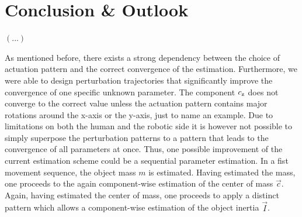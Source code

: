 \chapter{Conclusion \& Outlook}

$\left(...\right)$


As mentioned before, there exists a strong dependency between the choice of actuation pattern and the correct convergence of the estimation. Furthermore, we were able to design perturbation trajectories that significantly improve the convergence of one specific unknown parameter. The component $c_{\mathrm{z}}$ does not converge to the 
correct value unless the actuation pattern contains major rotations around the x-axis or the y-axis, just to name an example. Due to limitations on both the human and the robotic side it is however not possible to simply superpose the perturbation patterns to a pattern that leads to the convergence of all parameters at once. Thus, one possible improvement of the current estimation scheme could be a sequential parameter estimation. In a fist movement sequence, the object mass $m$ is estimated. Having estimated the mass, one proceeds to the again component-wise estimation of the center of mass $\vec{c}$. Again, having estimated the center of mass, one proceeds to apply a distinct pattern which allows a component-wise estimation of the object inertia $\vec{I}$. 
